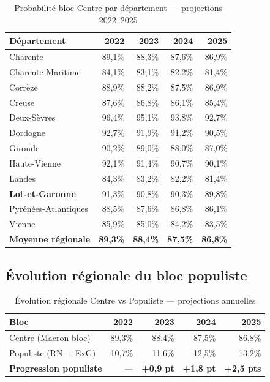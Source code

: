 \begin{table}[H]
\centering
\small
\caption{Probabilité bloc Centre par département --- projections 2022--2025}
\label{tab:proj_dept}
\begin{tabular}{lrrrr}
\toprule
\textbf{Département} & \textbf{2022} & \textbf{2023} & \textbf{2024} & \textbf{2025} \\
\midrule
Charente            & 89,1\% & 88,3\% & 87,6\% & 86,9\% \\
Charente-Maritime   & 84,1\% & 83,1\% & 82,2\% & 81,4\% \\
Corrèze             & 88,9\% & 88,2\% & 87,5\% & 86,9\% \\
Creuse              & 87,6\% & 86,8\% & 86,1\% & 85,4\% \\
Deux-Sèvres         & 96,4\% & 95,1\% & 93,8\% & 92,7\% \\
Dordogne            & 92,7\% & 91,9\% & 91,2\% & 90,5\% \\
Gironde             & 90,2\% & 89,0\% & 88,0\% & 87,0\% \\
Haute-Vienne        & 92,1\% & 91,4\% & 90,7\% & 90,1\% \\
Landes              & 84,3\% & 83,2\% & 82,2\% & 81,4\% \\
\textbf{Lot-et-Garonne}  & 91,3\% & 90,8\% & 90,3\% & 89,8\% \\
Pyrénées-Atlantiques & 88,5\% & 87,6\% & 86,8\% & 86,1\% \\
Vienne              & 85,9\% & 85,0\% & 84,2\% & 83,5\% \\
\midrule
\textbf{Moyenne régionale} & \textbf{89,3\%} & \textbf{88,4\%} & \textbf{87,5\%} & \textbf{86,8\%} \\
\bottomrule
\end{tabular}
\end{table}

\subsection{Évolution régionale du bloc populiste}

\begin{table}[H]
\centering
\caption{Évolution régionale Centre vs Populiste --- projections annuelles}
\label{tab:proj_regional}
\begin{tabular}{lrrrr}
\toprule
\textbf{Bloc} & \textbf{2022} & \textbf{2023} & \textbf{2024} & \textbf{2025} \\
\midrule
Centre (Macron bloc)  & 89,3\% & 88,4\% & 87,5\% & 86,8\% \\
Populiste (RN + ExG)  & 10,7\% & 11,6\% & 12,5\% & 13,2\% \\
\midrule
\textbf{Progression populiste} & --- & \textbf{+0,9 pt} & \textbf{+1,8 pt} & \textbf{+2,5 pts} \\
\bottomrule
\end{tabular}
\end{table}

